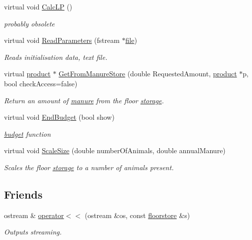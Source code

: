 \begin{DoxyCompactItemize}
virtual void \hyperlink{classfloorstore_a6ed09e1a63924c96ab2da073a89b83db}{CalcLP} ()
\begin{DoxyCompactList}\small\item\em probably obsolete \item\end{DoxyCompactList}\item 
virtual void \hyperlink{classfloorstore_ae1b9e00c23f4730f3f117a9e1000d2f6}{ReadParameters} (fstream $\ast$\hyperlink{classbase_a3af52ee9891719d09b8b19b42450b6f6}{file})
\begin{DoxyCompactList}\small\item\em Reads initialisation data, text file. \item\end{DoxyCompactList}\item 
virtual \hyperlink{classproduct}{product} $\ast$ \hyperlink{classfloorstore_a24e0d595a9a68e3a7cc2c6bf8ee1bee1}{GetFromManureStore} (double RequestedAmount, \hyperlink{classproduct}{product} $\ast$p, bool checkAccess=false)
\begin{DoxyCompactList}\small\item\em Return an amount of \hyperlink{classmanure}{manure} from the floor \hyperlink{classstorage}{storage}. \item\end{DoxyCompactList}\item 
virtual void \hyperlink{classfloorstore_a159e81c24a93fc32a230461b5e1ef161}{EndBudget} (bool show)
\begin{DoxyCompactList}\small\item\em \hyperlink{classbudget}{budget} function \item\end{DoxyCompactList}\item 
virtual void \hyperlink{classfloorstore_a568e6257a1fb9f6ca2a3c6113316aa3d}{ScaleSize} (double numberOfAnimals, double annualManure)
\begin{DoxyCompactList}\small\item\em Scales the floor \hyperlink{classstorage}{storage} to a number of animals present. \item\end{DoxyCompactList}\end{DoxyCompactItemize}
\subsection*{Friends}
\begin{DoxyCompactItemize}
\item 
ostream \& \hyperlink{classfloorstore_a2f4c08f25a5535c62d3d780806d5ce0b}{operator$<$$<$} (ostream \&os, const \hyperlink{classfloorstore}{floorstore} \&s)
\begin{DoxyCompactList}\small\item\em Outputs streaming. \item\end{DoxyCompactList}\end{DoxyCompactItemize}


